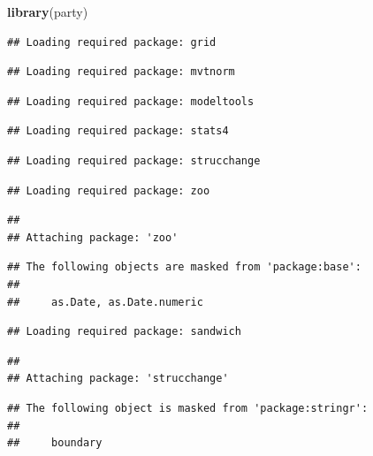 \documentclass[ignorenonframetext,]{beamer}
\newenvironment{Shaded}{\begin{snugshade}}{\end{snugshade}}
\newcommand{\KeywordTok}[1]{\textcolor[rgb]{0.13,0.29,0.53}{\textbf{#1}}}
\newcommand{\NormalTok}[1]{#1}
\begin{document}
\begin{frame}[fragile]{}
\protect\hypertarget{section-2}{}

\begin{Shaded}
\begin{Highlighting}[]
\KeywordTok{library}\NormalTok{(party)}
\end{Highlighting}
\end{Shaded}

\begin{verbatim}
## Loading required package: grid
\end{verbatim}

\begin{verbatim}
## Loading required package: mvtnorm
\end{verbatim}

\begin{verbatim}
## Loading required package: modeltools
\end{verbatim}

\begin{verbatim}
## Loading required package: stats4
\end{verbatim}

\begin{verbatim}
## Loading required package: strucchange
\end{verbatim}

\begin{verbatim}
## Loading required package: zoo
\end{verbatim}

\begin{verbatim}
## 
## Attaching package: 'zoo'
\end{verbatim}

\begin{verbatim}
## The following objects are masked from 'package:base':
## 
##     as.Date, as.Date.numeric
\end{verbatim}

\begin{verbatim}
## Loading required package: sandwich
\end{verbatim}

\begin{verbatim}
## 
## Attaching package: 'strucchange'
\end{verbatim}

\begin{verbatim}
## The following object is masked from 'package:stringr':
## 
##     boundary
\end{verbatim}


\end{frame}
\end{document}

